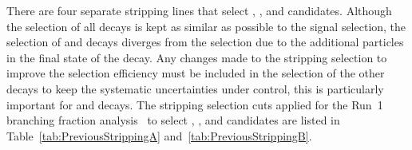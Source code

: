 There are four separate stripping lines that select \bmumu, \bujpsik, \bsjpsiphi and \bhh candidates. Although the selection of all decays is kept as similar as possible to the signal selection, the selection of \bujpsik and \bsjpsiphi decays diverges from the \bmumu selection due to the additional particles in the final state of the decay. Any changes made to the \bmumu stripping selection to improve the selection efficiency must be included in the selection of the other decays to keep the systematic uncertainties under control, this is particularly important for \bhh and \bujpsik decays. %
The stripping selection cuts applied for the Run~1 branching fraction analysis~\cite{CMS:2014xfa, Aaij:2013aka} to select \bmumu, \bujpsik, \bsjpsiphi and \bhh candidates are listed in Table~\ref{tab:PreviousStrippingA} and~\ref{tab:PreviousStrippingB}.

